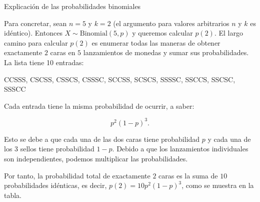 \documentclass[10pt]{beamer}
\begin{document}
\begin{frame}{Explicaci\'on de las probabilidades binomiales}
\small{ Para concretar, sean $n = 5$ y $k = 2$  (el argumento para valores arbitrarios $n$ y $k$ es id\'entico). Entonces $X \sim \text{Binomial}(5, p)$ y queremos calcular $p(2)$. El largo camino para calcular $p(2)$ es enumerar todas las maneras de obtener exactamente $2$ caras en $5$ lanzamientos  de monedas y sumar sus probabilidades. La lista tiene 10 entradas:
	
CCSSS, CSCSS, CSSCS, CSSSC, SCCSS, SCSCS, SSSSC, SSCCS, SSCSC,
SSSCC
	
Cada entrada tiene la misma probabilidad de ocurrir, a saber:

\[
p^2(1 - p)^3.
\]
}

\scriptsize{Esto se debe a que cada una de las dos caras tiene probabilidad $p$ y cada una de los $3$ sellos tiene probabilidad $1 - p$. Debido a que los lanzamientos individuales son independientes, podemos multiplicar las probabilidades. 
	
Por  tanto, la probabilidad total de exactamente $2$ caras  es la suma de $10$ probabilidades id\'enticas, es decir, $p(2) = 10p^2 (1 - p)^3$, como se muestra en la tabla.
}
\end{frame}
\end{document}
